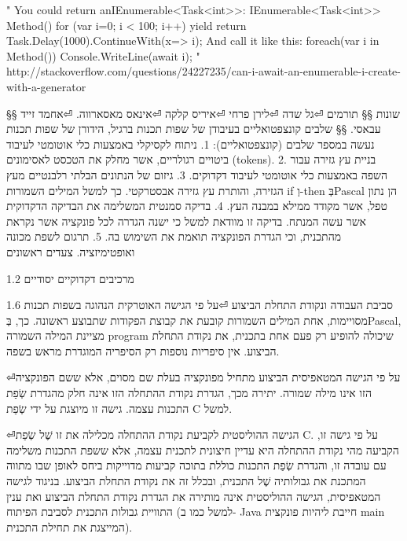 \begin{טבלא}[!htbp]
        "
        You could return anIEnumerable<Task<int>>:
        IEnumerable<Task<int>> Method() { for (var i=0; i < 100; i++) { yield return Task.Delay(1000).ContinueWith(x=> i); }}
        And call it like this:
        foreach(var i in Method()) Console.WriteLine(await i);
        "
        http://stackoverflow.com/questions/24227235/can-i-await-an-enumerable-i-create-with-a-generator

        §§ שונות
        §§ תורמים
⏎גל שדה
⏎לירן פרחי
⏎איריס קלקה
⏎אינאס מאסארווה.
⏎אחמד זייד עבאסי.
        §§ שלבים קונצפטואליים בעיבודן של שפות תכנות
        ברגיל, הידורן של שפות תכנות נעשה במספר שלבים (קונצפטואליים):
        1. ניתוח לקסיקלי באמצעות כלי אוטומטי לעיבוד ביטויים רגולריים, אשר מחלק את הטכסט לאסימונים (tokens).
        2. בניית עץ גזירה עבור השפה באמצעות כלי אוטומטי לעיבוד דקדוקים.
        3. גיזום של הנתונים הבלתי רלבנטיים מעץ הגזירה, והותרת עץ גזירה אבסטרקטי. כך למשל המילים השמורות if וְ-then בְּPascal הן נתון טפל, אשר מקודד ממילא במבנה העץ.
        4. בדיקה סמנטית המשלימה את הבדיקה הדקדוקית אשר עשה המנתח. בדיקה זו מוודאת למשל כי ישנה הגדרה לכל פונקציה אשר נקראת מהתכנית, וכי הגדרת הפונקציה תואמת את השימוש בה.
        5. תרגום לשפת מכונה ואופטימיזציה.
        צעדים ראשונים

        1.2 מרכיבים דקדוקיים יסודיים

        1.6 סביבת העבודה ונקודת התחלת הביצוע
⏎על פי הגישה האוטרקית הנהוגה בשפות תכנות מסויימות, אחת המילים השמורות קובעת את קבוצת הפקודות שתבוצע ראשונה. כך, בְּPascal, מציינת המילה השמורה program שיכולה להופיע רק פעם אחת בתכנית, את נקודת התחלת הביצוע. אין סיפריות נוספות רק הסיפריה המוגדרת מראש בשפה.

⏎על פי הגישה המטאפיסית הביצוע מתחיל מפונקציה בעלת שם מסוים, אלא ששם הפונקציה הזו אינו מילה שמורה. יתירה מכך, הגדרת נקודת ההתחלה הזו אינה חלק מהגדרת שְׂפַת התכנות עצמה. גישה זו מיוצגת על ידי שְׂפַת C למשל.

⏎הגישה ההוליסטית לקביעת נקודת ההתחלה מכלילה את זו שֶׁל שְׂפַת C. על פי גישה זו, הקביעה מהי נקודת ההתחלה היא עדיין חיצונית לתכנית עצמה, אלא ששפת התכנות משלימה עם עובדה זו, והגדרת שְׂפַת התכנות כוללת בתוכה קביעות מדוייקות ביחס לאופן שבו מתווה המתכנת את גבולותיה שֶׁל התכנית, ובכלל זה את נקודת התחלת הביצוע. בניגוד לגישה המטאפיסית, הגישה ההוליסטית אינה מותירה את הגדרת נקודת התחלת הביצוע ואת ענין התוויית גבולות התכנית לסביבת הפיתוח (למשל כמו ב- Java חייבת ליהיות פונקצית main המייצגת את תחילת התכנית).


\end{טבלא}

